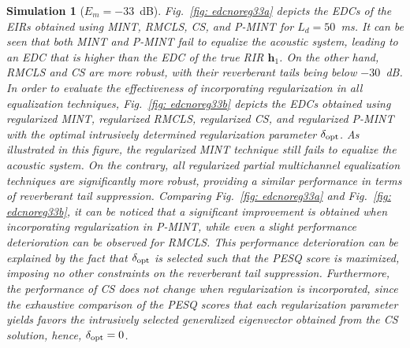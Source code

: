 \documentclass[10pt]{IEEEtran}
\newtheorem{simulation}{Simulation}
\begin{document}
\begin{simulation}[$E_m=-33$~dB]
\label{sim1} 
Fig.~\ref{fig: edcnoreg33a} depicts the EDCs of the EIRs obtained using MINT, RMCLS, CS, and P-MINT for $L_d = 50$~ms.
It can be seen that both MINT and P-MINT fail to equalize the acoustic system, leading to an EDC that is higher than the EDC of the true RIR $\mathbf{h}_1$.
On the other hand, RMCLS and CS are more robust, with their reverberant tails being below $-30$~dB.
In order to evaluate the effectiveness of incorporating regularization in all equalization techniques, Fig.~\ref{fig: edcnoreg33b} depicts the EDCs obtained using regularized MINT, regularized RMCLS, regularized CS, and regularized P-MINT with the optimal intrusively determined regularization parameter $\delta_{\rm opt}$.
As illustrated in this figure, the regularized MINT technique still fails to equalize the acoustic system.
On the contrary, all regularized partial multichannel equalization techniques are significantly more robust, providing a similar performance in terms of reverberant tail suppression.
Comparing Fig.~\ref{fig: edcnoreg33a} and Fig.~\ref{fig: edcnoreg33b}, it can be noticed that a significant improvement is obtained when incorporating regularization in P-MINT, while even a slight performance deterioration can be observed for RMCLS.
This performance deterioration can be explained by the fact that $\delta_{\rm opt}$ is selected such that the PESQ score is maximized, imposing no other constraints on the reverberant tail suppression.
Furthermore, the performance of CS does not change when regularization is incorporated, since the exhaustive comparison of the PESQ scores that each regularization parameter yields favors the intrusively selected generalized eigenvector obtained from the CS solution, hence, $\delta_{\rm opt} = 0$.


\end{simulation}
\end{document}
